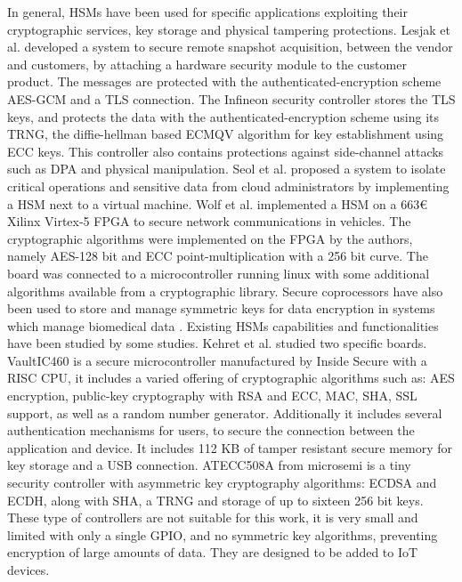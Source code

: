 In general, HSMs have been used for specific applications exploiting their cryptographic services, key storage and physical tampering protections.
Lesjak et al. \cite{iothardware} developed a system to secure remote snapshot acquisition, between the vendor and customers, by attaching a hardware security module to the customer product. 
The messages are protected with the authenticated-encryption scheme \ac{AES}-\ac{GCM} and a TLS connection.
The Infineon security controller stores the TLS keys, and protects the data with the authenticated-encryption scheme using its TRNG, the diffie-hellman based ECMQV algorithm for key establishment using ECC keys. This controller also contains protections against side-channel attacks such as \ac{DPA} and physical manipulation.
Seol et al. \cite{trustediaashsm} proposed a system to isolate critical operations and sensitive data from cloud administrators by implementing a \ac{HSM} next to a virtual machine.
Wolf et al. \cite{wolf2011design} implemented a HSM on a 663€ Xilinx Virtex-5 FPGA to secure network communications in vehicles. The cryptographic algorithms were implemented on the FPGA by the authors, namely AES-128 bit and ECC point-multiplication with a 256 bit curve. The board was connected to a microcontroller running linux with some additional algorithms available from a cryptographic library.
Secure coprocessors have also been used to store and manage symmetric keys for data encryption in systems which manage biomedical data \cite{canim2011biomedical}.
Existing HSMs capabilities and functionalities have been studied by some studies.
Kehret et al. \cite{tlsintegration} studied two specific boards.
VaultIC460 is a secure microcontroller manufactured by Inside Secure with a RISC CPU, it includes a varied offering of cryptographic algorithms such as: AES encryption, public-key cryptography with RSA and ECC, MAC, SHA, SSL support, as well as a random number generator. Additionally it includes several authentication mechanisms for users, to secure the connection between the application and device.
It includes 112 KB of tamper resistant secure memory for key storage and a USB connection.
ATECC508A from microsemi is a tiny security controller with asymmetric key cryptography algorithms: ECDSA and ECDH, along with SHA, a TRNG and storage of up to sixteen 256 bit keys.
These type of controllers are not suitable for this work, it is very small and limited with only a single GPIO, and no symmetric key algorithms, preventing encryption of large amounts of data. They are designed to be added to IoT devices.


